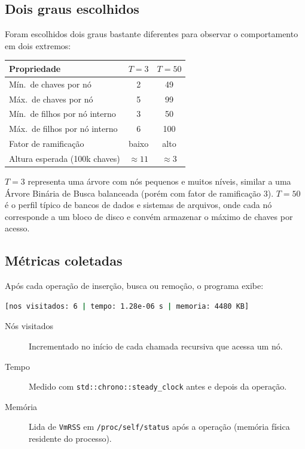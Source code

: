 \documentclass{ifpr-pinhais}
\begin{document}
\subsection{Dois graus escolhidos}

Foram escolhidos dois graus bastante diferentes para observar o comportamento em dois extremos:

\begin{center}
\begin{tabular}{lcc}
\toprule
Propriedade & $T = 3$ & $T = 50$ \\
\midrule
Mín.\ de chaves por nó & 2 & 49 \\
Máx.\ de chaves por nó & 5 & 99 \\
Mín.\ de filhos por nó interno & 3 & 50 \\
Máx.\ de filhos por nó interno & 6 & 100 \\
Fator de ramificação & baixo & alto \\
Altura esperada (100k chaves) & $\approx 11$ & $\approx 3$ \\
\bottomrule
\end{tabular}
\end{center}

$T = 3$ representa uma árvore com nós pequenos e muitos níveis, similar a uma Árvore Binária de Busca balanceada (porém com fator de ramificação 3). $T = 50$ é o perfil típico de bancos de dados e sistemas de arquivos, onde cada nó corresponde a um bloco de disco e convém armazenar o máximo de chaves por acesso.

\subsection{Métricas coletadas}

Após cada operação de inserção, busca ou remoção, o programa exibe:

\begin{lstlisting}[language=bash, numbers=none]
[nos visitados: 6 | tempo: 1.28e-06 s | memoria: 4480 KB]
\end{lstlisting}

\begin{description}
    \item[Nós visitados] Incrementado no início de cada chamada recursiva que acessa um nó.
    \item[Tempo] Medido com \texttt{std::chrono::steady\_clock} antes e depois da operação.
    \item[Memória] Lida de \texttt{VmRSS} em \texttt{/proc/self/status} após a operação (memória física residente do processo).
\end{description}
\end{document}
